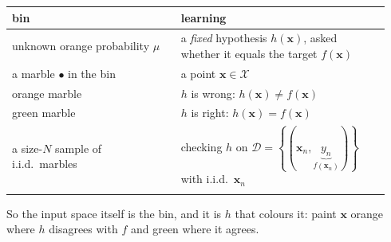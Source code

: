 \begin{center}
    \begin{tabular}{@{}p{0.42\linewidth}p{0.52\linewidth}@{}}
        \toprule
        \textbf{bin} & \textbf{learning}\\
        \midrule
        unknown orange probability \(\mu\)
        & a \emph{fixed} hypothesis \(h(\bm{x})\), asked whether it equals the
        target \(f(\bm{x})\)\\[4pt]
        a marble \(\bullet\) in the bin & a point \(\bm{x} \in \mathcal{X}\)\\[4pt]
        \textcolor{marbleorange}{orange} marble
        & \(h\) is \textcolor{marbleorange}{wrong}: \(h(\bm{x}) \neq f(\bm{x})\)\\[4pt]
        \textcolor{marblegreen}{green} marble
        & \(h\) is \textcolor{marblegreen}{right}: \(h(\bm{x}) = f(\bm{x})\)\\[4pt]
        a size-\(N\) sample of i.i.d.\ marbles
        & checking \(h\) on \(\mathcal{D} = \left\{ (\bm{x}_n,
        \underbrace{y_n}_{f(\bm{x}_n)}) \right\}\) with i.i.d.\ \(\bm{x}_n\)\\
        \addlinespace[5pt]
        \bottomrule
    \end{tabular}
\end{center}

So the input space itself is the bin, and it is \(h\) that colours it: paint
\(\bm{x}\) orange where \(h\) disagrees with \(f\) and green where it agrees.

